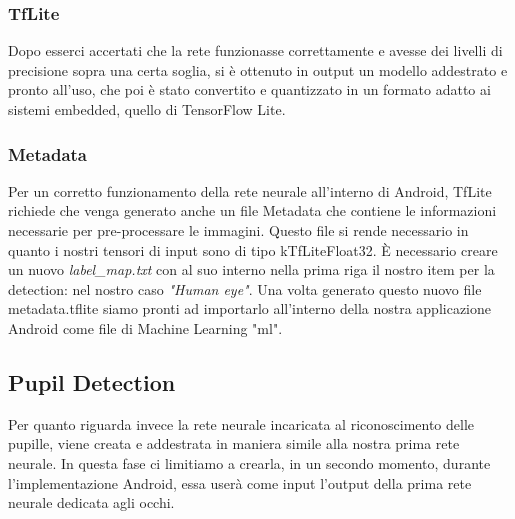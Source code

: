 \documentclass[11pt]{article}
\begin{document}
\subsubsection{TfLite}
\label{ssu:tfi}
Dopo esserci accertati che la rete funzionasse correttamente e avesse dei livelli di precisione sopra una certa soglia, si è ottenuto in output un modello addestrato
e pronto all’uso, che poi è stato convertito e quantizzato in un formato adatto ai sistemi embedded, quello di TensorFlow Lite.
\subsubsection{Metadata}
\label{ssu:mta}
Per un corretto funzionamento della rete neurale all'interno di Android, TfLite richiede che venga generato anche un file Metadata che contiene le informazioni necessarie per pre-processare le immagini. Questo file si rende necessario in quanto i nostri tensori di input sono di tipo kTfLiteFloat32. È necessario creare un nuovo \textit{label\_map.txt} con al suo interno nella prima riga il nostro item per la detection: nel nostro caso \textit{"Human eye"}.
\newline
Una volta generato questo nuovo file metadata.tflite siamo pronti ad importarlo all'interno della nostra applicazione Android come file di Machine Learning "ml".

\newpage    
\subsection{Pupil Detection}
\label{sub:det}
Per quanto riguarda invece la rete neurale incaricata al riconoscimento delle pupille, viene creata e addestrata in maniera simile alla nostra prima rete neurale. In questa fase ci limitiamo a crearla, in un secondo momento, durante l'implementazione Android, essa userà come input l'output della prima rete neurale dedicata agli occhi. 
\end{document}
